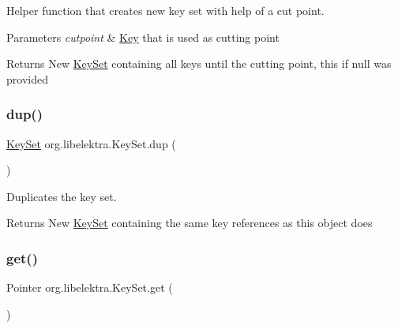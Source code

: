 Helper function that creates new key set with help of a cut point. 


\begin{DoxyParams}{Parameters}
{\em cutpoint} & \hyperlink{classorg_1_1libelektra_1_1Key}{Key} that is used as cutting point \\
\hline
\end{DoxyParams}
\begin{DoxyReturn}{Returns}
New \hyperlink{classorg_1_1libelektra_1_1KeySet}{Key\+Set} containing all keys until the cutting point, this if null was provided 
\end{DoxyReturn}
\mbox{\label{classorg_1_1libelektra_1_1KeySet_af3571c68cd55983c45666cf9f75143a1}} 
\subsubsection{\texorpdfstring{dup()}{dup()}}
{\footnotesize\ttfamily \hyperlink{classorg_1_1libelektra_1_1KeySet}{Key\+Set} org.\+libelektra.\+Key\+Set.\+dup (\begin{DoxyParamCaption}{ }\end{DoxyParamCaption})\hspace{0.3cm}{\ttfamily [inline]}}



Duplicates the key set. 

\begin{DoxyReturn}{Returns}
New \hyperlink{classorg_1_1libelektra_1_1KeySet}{Key\+Set} containing the same key references as this object does 
\end{DoxyReturn}
\mbox{\label{classorg_1_1libelektra_1_1KeySet_abf3f028c9c3b88a47aa9d67a5c8e95da}} 
\subsubsection{\texorpdfstring{get()}{get()}}
{\footnotesize\ttfamily Pointer org.\+libelektra.\+Key\+Set.\+get (\begin{DoxyParamCaption}{ }\end{DoxyParamCaption})\hspace{0.3cm}{\ttfamily [inline]}}



